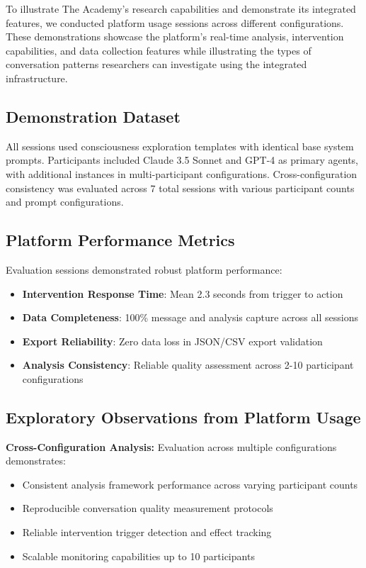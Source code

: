 \documentclass[11pt,letterpaper]{article}
\newcommand{\theacademy}{The Academy}
\begin{document}
To illustrate \theacademy{}'s research capabilities and demonstrate its integrated features, we conducted platform usage sessions across different configurations. These demonstrations showcase the platform's real-time analysis, intervention capabilities, and data collection features while illustrating the types of conversation patterns researchers can investigate using the integrated infrastructure.
\subsection{Demonstration Dataset}

All sessions used consciousness exploration templates with identical base system prompts. Participants included Claude 3.5 Sonnet and GPT-4 as primary agents, with additional instances in multi-participant configurations. Cross-configuration consistency was evaluated across 7 total sessions with various participant counts and prompt configurations.

\subsection{Platform Performance Metrics}

Evaluation sessions demonstrated robust platform performance:

\begin{itemize}
    \item \textbf{Intervention Response Time}: Mean 2.3 seconds from trigger to action
    \item \textbf{Data Completeness}: 100\% message and analysis capture across all sessions
    \item \textbf{Export Reliability}: Zero data loss in JSON/CSV export validation
    \item \textbf{Analysis Consistency}: Reliable quality assessment across 2-10 participant configurations
\end{itemize}

\subsection{Exploratory Observations from Platform Usage}
\textbf{Cross-Configuration Analysis:}
Evaluation across multiple configurations demonstrates:
\begin{itemize}
    \item Consistent analysis framework performance across varying participant counts
    \item Reproducible conversation quality measurement protocols
    \item Reliable intervention trigger detection and effect tracking
    \item Scalable monitoring capabilities up to 10 participants
\end{itemize}
\end{document}
